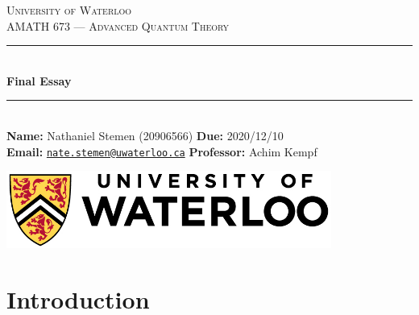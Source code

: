 \documentclass[11pt]{article}
\begin{document}
\begin{titlepage}
	\newcommand{\HRule}{\rule{\linewidth}{0.5mm}}

	\begin{center}

		\textsc{\LARGE University of Waterloo}\\[1.5cm]

		\textsc{\large AMATH 673 --- Advanced Quantum Theory}\\[0.75cm]

		\HRule\\[0.4cm]

		{\huge\bfseries Final Essay}\\[0.15cm]

		\HRule\\[1cm]

		{\large
		\textbf{Name:} Nathaniel Stemen (20906566)\hspace{\fill} \textbf{Due:} 2020/12/10 \\
		\textbf{Email:} \href{mailto:nate.stemen@uwaterloo.ca}{\texttt{nate.stemen@uwaterloo.ca}} \hspace{\fill} \textbf{Professor:} Achim Kempf
		}

		\vfill
		\includegraphics[width=0.8\textwidth]{uwlogo.jpg}\\[1cm]
	\end{center}
\end{titlepage}

\tableofcontents

\newpage

\section{Introduction}
\end{document}
